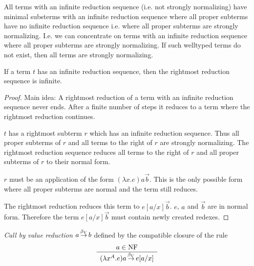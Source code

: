 All terms with an infinite reduction sequence (i.e. not strongly normalizing)
have minimal substerms with an infinite reduction sequence where all proper
subterms have no infinite reduction sequence i.e. where all proper subterms are
strongly normalizing. I.e. we can concentrate on terms with an infinite
reduction sequence where all proper subterms are strongly normalizing. If such
welltyped terms do not exist, then all terms are strongly normalizing.


\begin{theorem} If a term $t$ has an infinite reduction sequence, then the
    rightmost reduction sequence is infinite.

    \begin{proof}
        Main idea: A rightmost reduction of a term with an infinite reduction
        sequence never ends. After a finite number of steps it reduces to a term
        where the rightmost reduction continues.

        $t$ has  a rightmost subterm $r$ which has an infinite reduction
        sequence. Thus all proper subterms of $r$ and all terms to the right of
        $r$ are strongly normalizing. The rightmost reduction sequence reduces
        all terms to the right of $r$ and all proper subterms of $r$ to their
        normal form.

        $r$ must be an application of the form $(\lambda x. e) a \vec b$. This
        is the only possible form where all proper subterms are normal and the
        term still reduces.

        The rightmost reduction reduces this term to $e[a/x] \vec b$. $e$, $a$
        and $\vec b$ are in normal form. Therefore the term $e[a/x] \vec b$ must
        contain newly created redexes.
    \end{proof}
\end{theorem}







\begin{definition}
    \emph{Call by value reduction} $a {{\,\stackrel{\beta_V}{\to}\,}} b$ defined by the compatible
    closure of the rule
    $$
    \begin{array}{c} 
        a \in {\text{NF}}
     \\ \hline 
        (\lambda x^A. e) a {{\,\stackrel{\beta_V}{\to}\,}} e[a/x]
    \end{array}
    $$
\end{definition}



